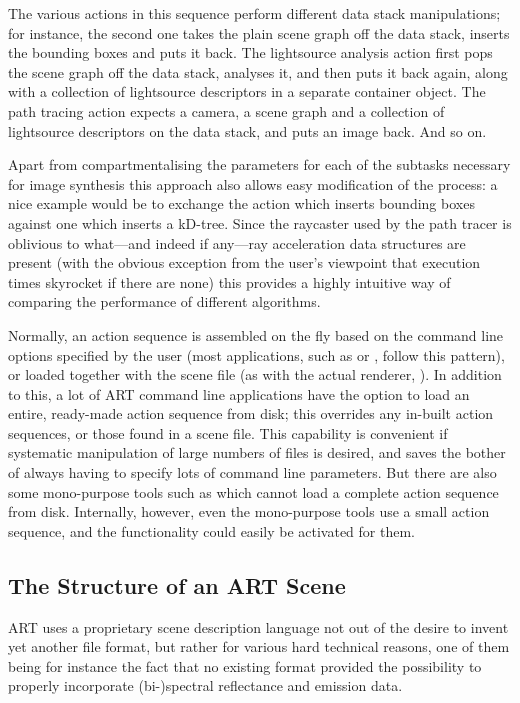 The various actions in this sequence perform different data stack manipulations;
for instance, the second one takes the plain scene graph off the data stack,
inserts the bounding boxes and puts it back. The lightsource analysis action
first pops the scene graph off the data stack, analyses it, and then puts it back
again, along with a collection of lightsource descriptors in a separate
container object. The path tracing action expects a camera, a scene graph and a
collection of lightsource descriptors on the data stack, and puts an
 image back. And so on.

Apart from compartmentalising the parameters for each of the subtasks necessary
for image synthesis this approach also allows easy modification of the process:
a nice example would be to exchange the action which inserts bounding boxes
against one which inserts a kD-tree. Since the raycaster used by the path tracer
is oblivious to what---and indeed if any---ray acceleration data structures are
present (with the obvious exception from the user's viewpoint that execution
times skyrocket if there are none) this provides a highly intuitive way of
comparing the performance of different algorithms.

Normally, an action sequence is assembled on the fly based on the command line options specified by the user (most applications, such as  or , follow this pattern), or loaded together with the scene file (as with the actual renderer, ). In addition to this, a lot of ART command line applications have the option  to load an entire, ready-made action sequence from disk; this overrides any in-built action sequences, or those found in a scene file. This capability is convenient if systematic manipulation of large numbers of files is desired, and saves the bother of always having to specify lots of command line parameters. But there are also some mono-purpose tools such as  which cannot load a complete action sequence from disk. Internally, however, even the mono-purpose tools use a small action sequence, and the  functionality could easily be activated for them.

\subsection{The Structure of an ART Scene}
ART uses a proprietary scene description language not out of the desire to
invent yet another file format, but rather for various hard technical reasons,
one of them being for instance the fact that no existing format provided the
possibility to properly incorporate (bi-)spectral reflectance and emission data. 

